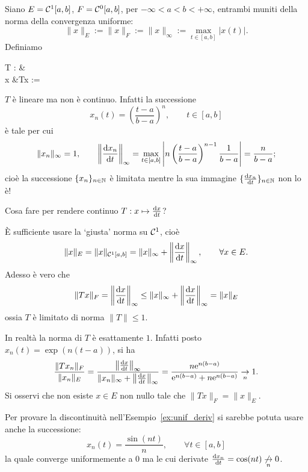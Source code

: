 \begin{example}
\label{ex:unif_deriv}
	Siano $E = \Cone[a,b]$, $F = \Czero[a,b]$, per $-\infty < a < b < +\infty$, entrambi muniti della norma della convergenza uniforme:
	$$
		\|x\|_E := \|x\|_F := \|x\|_\infty := \max_{t \in [a,b]} |x(t)|.
	$$
	Definiamo
	\begin{eqalign}
		T : \Cone[a,b] &\longto \Czero[a,b]\\
		x &\longmapsto Tx := 
	\end{eqalign}
	$T$ è lineare ma non è continuo. Infatti la successione
	$$
		x_n(t) = \left(\frac{t-a}{b-a}\right)^n, \qquad t \in [a,b]
	$$
	è tale per cui
	$$
		\|x_n\|_\infty = 1, \qquad \left\|\der{x_n}{t}\right\|_\infty = \max_{t \in [a,b]} \left| n \left(\frac{t-a}{b-a}\right)^{n-1} \frac1{b-a} \right| = \frac{n}{b-a};
	$$
	cioè la successione $\{x_n\}_{n \in \N}$ è limitata mentre la sua immagine $\{\der{x_n}t\}_{n \in \N}$ non lo è!
\end{example}

\begin{question*}
	Cosa fare per rendere continuo $T : x \mapsto \der{x}{t}$?
\end{question*}

È sufficiente usare la `giusta' norma su $\Cone$, cioè
$$
	\|x\|_E = \|x\|_{\Cone[a,b]} = \|x\|_\infty + \left\|\der{x}{t}\right\|_\infty, \qquad \forall x \in E.
$$
Adesso è vero che
$$
	\|Tx\|_F = \left\|\der{x}{t}\right\|_\infty \leq \|x\|_\infty + \left\|\der{x}{t}\right\|_\infty = \|x\|_E
$$
ossia $T$ è limitato di norma $\|T\| \leq 1$.

In realtà la norma di $T$ è esattamente $1$. Infatti posto $x_n(t) = \exp(n(t-a))$, si ha
$$
	\frac{\|Tx_n\|_F}{\|x_n\|_E} = \frac{\left\|\der{x}{t}\right\|_\infty}{\|x_n\|_\infty + \left\|\der{x}{t}\right\|_\infty} = \frac{n\e^{n(b-a)}}{\e^{n(b-a)} + n\e^{n(b-a)}} \conv[n] 1.
$$
Si osservi che non esiste $x \in E$ non nullo tale che $\|Tx\|_F = \|x\|_E$.

\begin{remark}
	Per provare la discontinuità nell'Esempio~\ref{ex:unif_deriv} si sarebbe potuta usare anche la successione:
	$$
		x_n(t) = \frac{\sin (nt)}n, \qquad \forall t \in [a,b]
	$$
	la quale converge uniformemente a $0$ ma le cui derivate $\der{x_n}t = \cos(nt) \not\conv[n] 0$.
\end{remark}


